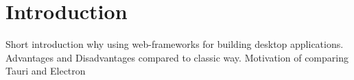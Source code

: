\section{Introduction}
\label{sec:introduction}
Short introduction why using web-frameworks for building desktop applications.
Advantages and Disadvantages compared to classic way.
Motivation of comparing Tauri and Electron